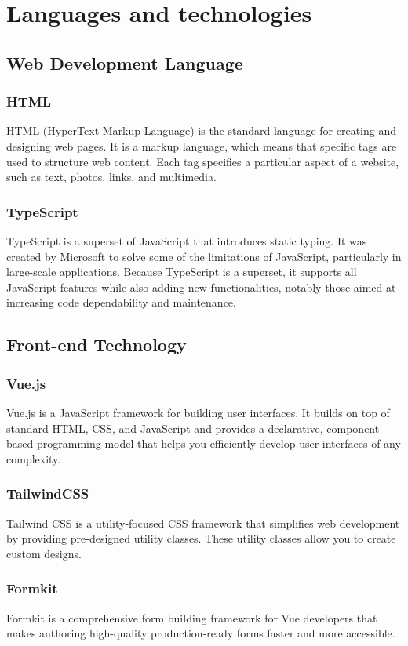 \documentclass[12pt,oneside,openright,a4paper]{cpe-english-project}
\begin{document}
\section{Languages and technologies}
\subsection{Web Development Language}
\subsubsection{HTML} HTML (HyperText Markup Language) is the standard language for creating and designing web pages. It is a markup language, which means that specific tags are used to structure web content. Each tag specifies a particular aspect of a website, such as text, photos, links, and multimedia.

\subsubsection{TypeScript} TypeScript is a superset of JavaScript that introduces static typing. It was created by Microsoft to solve some of the limitations of JavaScript, particularly in large-scale applications. Because TypeScript is a superset, it supports all JavaScript features while also adding new functionalities, notably those aimed at increasing code dependability and maintenance.

\subsection{Front-end Technology}
\subsubsection{Vue.js} Vue.js is a JavaScript framework for building user interfaces. It builds on top of standard HTML, CSS, and JavaScript and provides a declarative, component-based programming model that helps you efficiently develop user interfaces of any complexity.

\subsubsection{TailwindCSS} Tailwind CSS is a utility-focused CSS framework that simplifies web development by providing pre-designed utility classes. These utility classes allow you to create custom designs.

\subsubsection{Formkit} Formkit is a comprehensive form building framework for Vue developers that makes authoring high-quality production-ready forms faster and more accessible.
\end{document}
